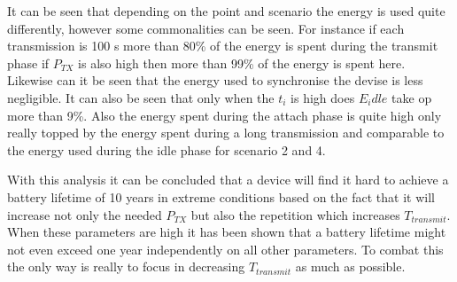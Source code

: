 It can be seen that depending on the point and scenario the energy is used quite differently, however some commonalities can be seen. For instance if each transmission is 100 s more than 80\% of the energy is spent during the transmit phase if $P_{TX}$ is also high then more than 99\% of the energy is spent here. Likewise can it be seen that the energy used to synchronise the devise is less negligible. It can also be seen that only when the $t_i$ is high does $E_idle$ take op more than 9\%. Also the energy spent during the attach phase is quite high only really topped by the energy spent during a long transmission and comparable to the energy used during the idle phase for scenario 2 and 4. 

With this analysis it can be concluded that a device will find it hard to achieve a battery lifetime of 10 years in extreme conditions based on the fact that it will increase not only the needed $P_{TX}$ but also the repetition which increases $T_{transmit}$. When these parameters are high it has been shown that a battery lifetime might not even exceed one year independently on all other parameters. To combat this the only way is really to focus in decreasing $T_{transmit}$ as much as possible. 
